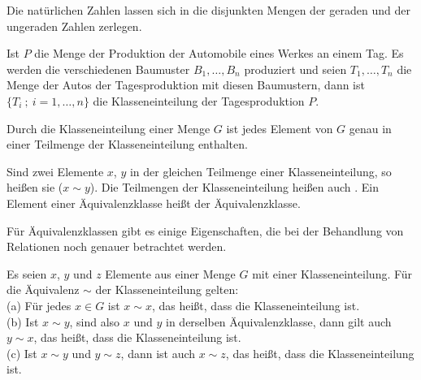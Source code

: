 \begin{Unit}[Beispiel]
  Die natürlichen Zahlen lassen sich in die disjunkten Mengen der geraden und 
  der ungeraden Zahlen zerlegen.
\end{Unit}

\begin{Unit}[Beispiel]
  Ist $P$ die Menge der Produktion der Automobile eines Werkes an einem Tag. 
  Es werden die verschiedenen Baumuster $B_1,\ldots, B_n$ produziert und 
  seien $T_1, \ldots, T_n$ die Menge der Autos der Tagesproduktion mit diesen 
  Baumustern, dann ist $\{T_i\ ;\ i = 1,\ldots,n\}$ die Klasseneinteilung der 
  Tagesproduktion $P$.
\end{Unit}

\begin{Unit}
Durch die Klasseneinteilung einer Menge $G$ ist jedes Element von $G$ genau 
in einer Teilmenge der Klasseneinteilung enthalten.

\begin{Definition}
  Sind zwei Elemente $x$, $y$ in der gleichen Teilmenge einer 
  Klasseneinteilung, so heißen sie  ($x \sim y$). Die 
  Teilmengen der Klasseneinteilung heißen auch . 
  Ein Element einer Äquivalenzklasse heißt  der
  Äquivalenzklasse.
\end{Definition}
\end{Unit}

\begin{Unit}[Bemerkung]
Für Äquivalenzklassen gibt es einige Eigenschaften, die bei der Behandlung 
von Relationen noch genauer betrachtet werden.
 
\begin{Bemerkung}
  Es seien $x$, $y$ und $z$ Elemente aus einer Menge $G$ mit einer 
  Klasseneinteilung. Für die Äquivalenz $\sim$ der Klasseneinteilung 
  gelten: \\
  (a) Für jedes $x \in G$ ist $x \sim x$, das heißt, dass die 
    Klasseneinteilung  ist. \\
  (b) Ist $x \sim y$, sind also $x$ und $y$ in derselben Äquivalenzklasse, 
    dann gilt auch $y \sim x$, das heißt, dass die Klasseneinteilung 
     ist. \\
  (c) Ist $x \sim y$ und $y \sim z$, dann ist auch $x \sim z$, das heißt, 
    dass die Klasseneinteilung  ist.
\end{Bemerkung}
\end{Unit}

